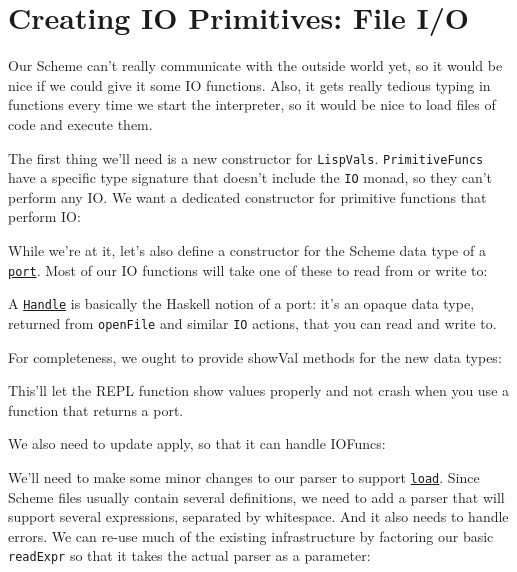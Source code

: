 \chapter[Creating IO Primitives]{Creating IO Primitives: File I/O}
 
 
Our Scheme can't really communicate with the outside world yet, so it would be nice if we could give it some IO functions. Also, it gets really tedious typing in functions every time we start the interpreter, so it would be nice to load files of code and execute them.
 
The first thing we'll need is a new constructor for \verb|LispVals|. \verb|PrimitiveFuncs| have a specific type signature that doesn't include the \verb|IO| monad, so they can't perform any IO. We want a dedicated constructor for primitive functions that perform IO:
 
 
While we're at it, let's also define a constructor for the Scheme data type of a \href{http://www.schemers.org/Documents/Standards/R5RS/HTML/r5rs-Z-H-9.html\#\%_sec_6.6.1}{\texttt{port}}. Most of our IO functions will take one of these to read from or write to:
 
 
A \href{http://www.haskell.org/onlinereport/io.html\#sect21}{\texttt{Handle}} is basically the Haskell notion of a port: it's an opaque data type, returned from \verb|openFile| and similar \verb|IO| actions, that you can read and write to.
 
For completeness, we ought to provide showVal methods for the new data types:
 
 
This'll let the REPL function show values properly and not crash when you use a function that returns a port.
 
We also need to update apply, so that it can handle IOFuncs:
 
We'll need to make some minor changes to our parser to support \href{http://www.schemers.org/Documents/Standards/R5RS/HTML/r5rs-Z-H-9.html\#\%_sec_6.6.4}{\texttt{load}}. Since Scheme files usually contain several definitions, we need to add a parser that will support several expressions, separated by whitespace. And it also needs to handle errors. We can re-use much of the existing infrastructure by factoring our basic \verb|readExpr| so that it takes the actual parser as a parameter:
 
